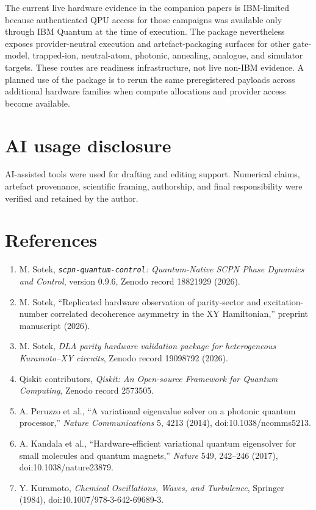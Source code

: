 \documentclass[11pt]{article}
\begin{document}
The current live hardware evidence in the companion papers is IBM-limited
because authenticated QPU access for those campaigns was available only through
IBM Quantum at the time of execution. The package nevertheless exposes
provider-neutral execution and artefact-packaging surfaces for other
gate-model, trapped-ion, neutral-atom, photonic, annealing, analogue, and
simulator targets. These routes are readiness infrastructure, not live
non-IBM evidence. A planned use of the package is to rerun the same
preregistered payloads across additional hardware families when compute
allocations and provider access become available.

\section*{AI usage disclosure}

AI-assisted tools were used for drafting and editing support. Numerical claims,
artefact provenance, scientific framing, authorship, and final responsibility
were verified and retained by the author.

\section*{References}

\begin{enumerate}[leftmargin=*]
  \item M. Sotek, \emph{\texttt{scpn-quantum-control}: Quantum-Native SCPN Phase Dynamics and Control}, version 0.9.6, Zenodo record 18821929 (2026).
  \item M. Sotek, ``Replicated hardware observation of parity-sector and excitation-number correlated decoherence asymmetry in the XY Hamiltonian,'' preprint manuscript (2026).
  \item M. Sotek, \emph{DLA parity hardware validation package for heterogeneous Kuramoto--XY circuits}, Zenodo record 19098792 (2026).
  \item Qiskit contributors, \emph{Qiskit: An Open-source Framework for Quantum Computing}, Zenodo record 2573505.
  \item A. Peruzzo et al., ``A variational eigenvalue solver on a photonic quantum processor,'' \emph{Nature Communications} 5, 4213 (2014), doi:10.1038/ncomms5213.
  \item A. Kandala et al., ``Hardware-efficient variational quantum eigensolver for small molecules and quantum magnets,'' \emph{Nature} 549, 242--246 (2017), doi:10.1038/nature23879.
  \item Y. Kuramoto, \emph{Chemical Oscillations, Waves, and Turbulence}, Springer (1984), doi:10.1007/978-3-642-69689-3.
\end{enumerate}
\end{document}
